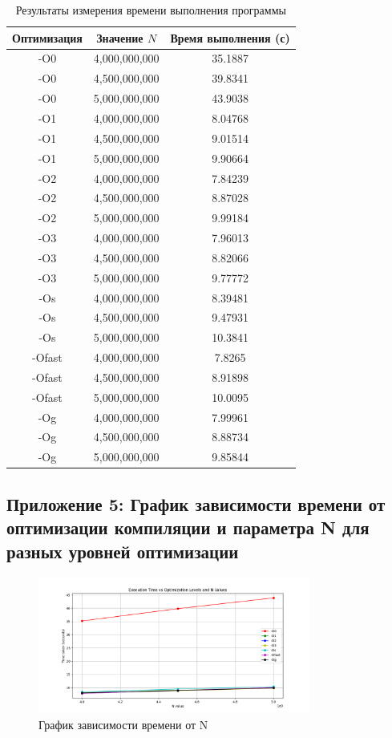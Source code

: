\documentclass[12pt,a4paper]{article}
\numberwithin{subsection}{section}
\begin{document}
\begin{table}[H]
\centering
\begin{tabular}{|c|c|c|}
\hline
Оптимизация & Значение \(N\) & Время выполнения (с) \\
\hline
-O0 & 4,000,000,000 & 35.1887 \\
-O0 & 4,500,000,000 & 39.8341 \\
-O0 & 5,000,000,000 & 43.9038 \\
\hline
-O1 & 4,000,000,000 & 8.04768 \\
-O1 & 4,500,000,000 & 9.01514 \\
-O1 & 5,000,000,000 & 9.90664 \\
\hline
-O2 & 4,000,000,000 & 7.84239 \\
-O2 & 4,500,000,000 & 8.87028 \\
-O2 & 5,000,000,000 & 9.99184 \\
\hline
-O3 & 4,000,000,000 & 7.96013 \\
-O3 & 4,500,000,000 & 8.82066 \\
-O3 & 5,000,000,000 & 9.77772 \\
\hline
-Os & 4,000,000,000 & 8.39481 \\
-Os & 4,500,000,000 & 9.47931 \\
-Os & 5,000,000,000 & 10.3841 \\
\hline
-Ofast & 4,000,000,000 & 7.8265 \\
-Ofast & 4,500,000,000 & 8.91898 \\
-Ofast & 5,000,000,000 & 10.0095 \\
\hline
-Og & 4,000,000,000 & 7.99961 \\
-Og & 4,500,000,000 & 8.88734 \\
-Og & 5,000,000,000 & 9.85844 \\
\hline
\end{tabular}

\caption{Результаты измерения времени выполнения программы}
\label{tab:measurements}

\end{table}


\subsection*{Приложение 5: График зависимости времени от оптимизации компиляции
 и параметра N для разных уровней оптимизации}

\begin{figure}[H]
    \centering
    \includegraphics[width=0.8\textwidth]{5.png}
    \caption{График зависимости времени от N}
\end{figure}
\end{document}
